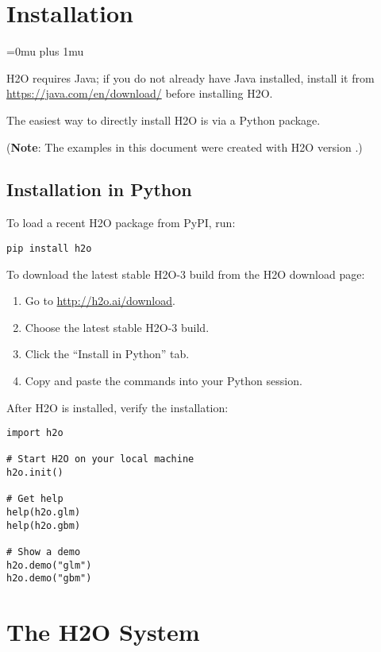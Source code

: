 \section{Installation} 
\Urlmuskip=0mu plus 1mu\relax %

H2O requires Java; if you do not already have Java installed, install it from {\url{https://java.com/en/download/}} before installing H2O. 

The easiest way to directly install H2O is  via a Python package.

({\bf{Note}}: The examples in this document were created with H2O version \waterVersion.)

\subsection{Installation in Python}

To load a recent H2O package from PyPI, run:

\begin{lstlisting}[style=python]
pip install h2o
\end{lstlisting}

To download the
latest stable H2O-3 build from the H2O download page:

\begin{enumerate}
\item Go to {\url{http://h2o.ai/download}}.
\item Choose the latest stable H2O-3 build.
\item Click the ``Install in Python'' tab.
\item Copy and paste the commands into your Python session.
\end{enumerate}


\bigskip
After H2O is installed, verify the installation:

\begin{lstlisting}[style=python]
import h2o

# Start H2O on your local machine
h2o.init()

# Get help
help(h2o.glm)
help(h2o.gbm)

# Show a demo
h2o.demo("glm")
h2o.demo("gbm")

\end{lstlisting}


\section{The H2O System}

